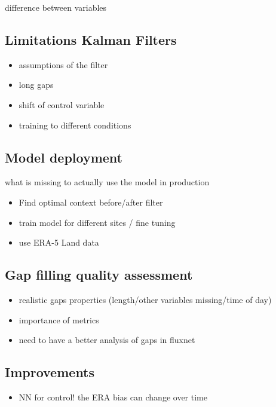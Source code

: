\documentclass{article}
\let\Oldsubsection\subsection
\renewcommand{\subsection}{\FloatBarrier\Oldsubsection}
\begin{document}
difference between variables

\subsection{Limitations Kalman Filters}

\begin{itemize}
    \item assumptions of the filter
    \item long gaps
    \item shift of control variable
    \item training to different conditions
\end{itemize}

\subsection{Model deployment}

what is missing to actually use the model in production

\begin{itemize}
    \item Find optimal context before/after filter
    \item train model for different sites / fine tuning
    \item use ERA-5 Land data
\end{itemize}


\subsection{Gap filling quality assessment}

\begin{itemize}
    \item realistic gaps properties (length/other variables missing/time of day)
    \item importance of metrics
\item need to have a better analysis of gaps in fluxnet
\end{itemize}

\subsection{Improvements}

\begin{itemize}
\item NN for control! the ERA bias can change over time
\end{itemize}
\end{document}
